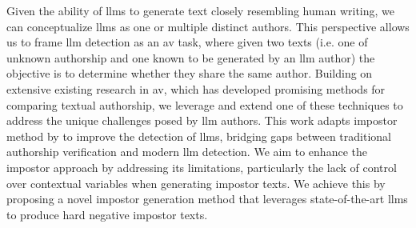 Given the ability of \acp{llm} to generate text closely resembling human writing, we can conceptualize \acp{llm} as one or multiple distinct authors.
This perspective allows us to frame \ac{llm} detection as an \ac{av} task, where given two texts (i.e. one of unknown authorship and one known to be generated by an \ac{llm} author) the objective is to determine whether they share the same author.
Building on extensive existing research in \ac{av}, which has developed promising methods for comparing textual authorship, we leverage and extend one of these techniques to address the unique challenges posed by \ac{llm} authors. 
This work adapts impostor method by \citet{koppel_determining_2014} to improve the detection of \acp{llm}, bridging gaps between traditional authorship verification and modern \ac{llm} detection.
We aim to enhance the impostor approach by addressing its limitations, particularly the lack of control over contextual variables when generating impostor texts.
We achieve this by proposing a novel impostor generation method that leverages state-of-the-art \acp{llm} to produce hard negative impostor texts.

